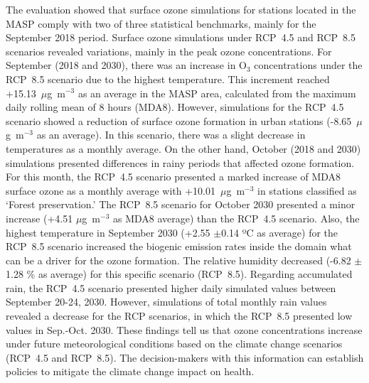 \begin{spacing}{1.5}
The evaluation showed that surface ozone simulations for stations located in the MASP comply with two of three statistical benchmarks, mainly for the September 2018 period.
Surface ozone simulations under RCP~4.5 and RCP~8.5 scenarios revealed variations, mainly in the peak ozone concentrations.
For September (2018 and 2030), there was an increase in O$_3$ concentrations under the RCP~8.5 scenario due to the highest temperature. This increment reached +15.13~$\mu$g~m$^{-3}$ as an average in the MASP area, calculated from the maximum daily rolling mean of 8 hours (MDA8). However, simulations for the RCP~4.5 scenario showed a reduction of surface ozone formation in urban stations (-8.65~$\mu$g~m$^{-3}$ as an average). In this scenario, there was a slight decrease in temperatures as a monthly average.
On the other hand, October (2018 and 2030) simulations presented differences in rainy periods that affected ozone formation. For this month, the RCP~4.5 scenario presented a marked increase of MDA8 surface ozone as a monthly average with +10.01~$\mu$g~m$^{-3}$ in stations classified as `Forest preservation.' The RCP~8.5 scenario for October 2030 presented a minor increase (+4.51 $\mu$g~m$^{-3}$ as MDA8 average) than the RCP~4.5 scenario.
Also, the highest temperature in September 2030 (+2.55 $\pm$0.14 ºC as average) for the RCP~8.5 scenario increased the biogenic emission rates inside the domain what can be a driver for the ozone formation.  
The relative humidity decreased (-6.82 $\pm$1.28 \% as average) for this specific scenario (RCP~8.5). Regarding accumulated rain, the RCP~4.5 scenario presented higher daily simulated values between September 20-24, 2030. However, simulations of total monthly rain values revealed a decrease for the RCP scenarios, in which the RCP~8.5 presented low values in Sep.-Oct. 2030. 
These findings tell us that ozone concentrations increase under future meteorological conditions based on the climate change scenarios (RCP~4.5 and RCP~8.5). The decision-makers with this information can establish policies to mitigate the climate change impact on health.

	\cleardoublepage
	

\end{spacing}
